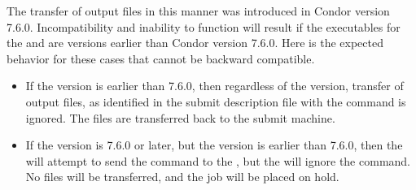 The transfer of output files in this manner was introduced 
in Condor version 7.6.0. 
Incompatibility and inability to function will result if the executables
for the  and  are versions earlier
than Condor version 7.6.0.
Here is the expected behavior for these cases that 
cannot be backward compatible. 
\begin{itemize}
\item
If the  version is earlier than 7.6.0,
then regardless of the  version,
transfer of output files, as identified in the submit description
file with the command  is ignored.
The files are transferred back to the submit machine.
\item
If the  version is 7.6.0 or later,
but the   version is earlier than 7.6.0,
then the  will attempt to send the command to the
, but the  will ignore the command.
No files will be transferred, and the job will be placed on hold.
\end{itemize}

